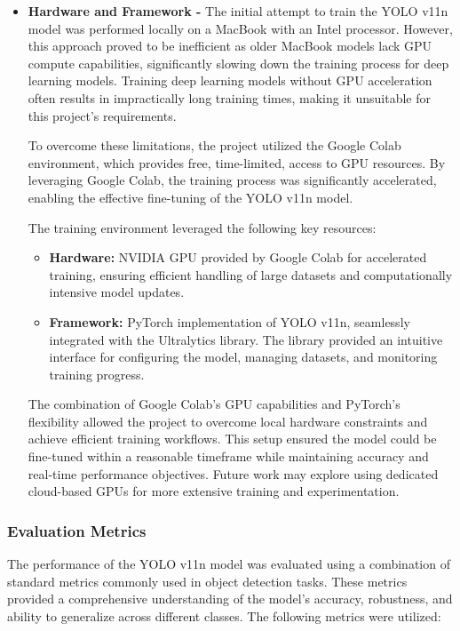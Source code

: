 \documentclass[11pt]{article}
\begin{document}
\begin{itemize}
\begin{itemize}
            \end{itemize}
    \item \textbf{Hardware and Framework -} The initial attempt to train the YOLO v11n model was performed locally on a MacBook with an Intel processor. However, this approach proved to be inefficient as older MacBook models lack GPU compute capabilities, significantly slowing down the training process for deep learning models. Training deep learning models without GPU acceleration often results in impractically long training times, making it unsuitable for this project’s requirements.
    
    To overcome these limitations, the project utilized the Google Colab environment, which provides free, time-limited, access to GPU resources. By leveraging Google Colab, the training process was significantly accelerated, enabling the effective fine-tuning of the YOLO v11n model.
    
    The training environment leveraged the following key resources:
    \begin{itemize} 
        \item \textbf{Hardware:} NVIDIA GPU provided by Google Colab for accelerated training, ensuring efficient handling of large datasets and computationally intensive model updates. 
        \item \textbf{Framework:} PyTorch implementation of YOLO v11n, seamlessly integrated with the Ultralytics library. The library provided an intuitive interface for configuring the model, managing datasets, and monitoring training progress. 
    \end{itemize}

The combination of Google Colab's GPU capabilities and PyTorch’s flexibility allowed the project to overcome local hardware constraints and achieve efficient training workflows. This setup ensured the model could be fine-tuned within a reasonable timeframe while maintaining accuracy and real-time performance objectives. Future work may explore using dedicated cloud-based GPUs for more extensive training and experimentation.
    \end{itemize}


\subsubsection{Evaluation Metrics}
The performance of the YOLO v11n model was evaluated using a combination of standard metrics commonly used in object detection tasks. These metrics provided a comprehensive understanding of the model's accuracy, robustness, and ability to generalize across different classes. The following metrics were utilized:
\end{document}
